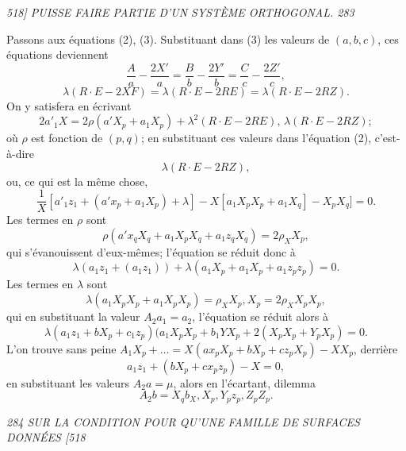 \documentclass[11pt,a4paper]{book}
\begin{document}
\clearpage

\noindent\textit{518] \hfill PUISSE FAIRE PARTIE D'UN SYST\`EME ORTHOGONAL. \hfill 283}

\medskip

Passons aux \'equations (2), (3). Substituant dans (3) les valeurs de $(a, b, c)$, ces
\'equations deviennent
\[
\frac{A}{a} - \frac{2X'}{a} = \frac{B}{b} - \frac{2Y'}{b} = \frac{C}{c} - \frac{2Z'}{c},
\]
\[
\lambda(R \cdot E - 2XF) = \lambda(R \cdot E - 2RE) = \lambda(R \cdot E - 2RZ).
\]
On y satisfera en \'ecrivant
\[
2a'_1 X = 2\rho(a' X_p + a_1 X_p) + \lambda^2(R \cdot E - 2RE), \, \lambda(R \cdot E - 2RZ);
\]
o\`u $\rho$ est fonction de $(p, q)$; en substituant ces valeurs dans l'\'equation (2), c'est-\`a-dire
\[
\lambda(R \cdot E - 2RZ),
\]
ou, ce qui est la m\^eme chose,
\[
\frac{1}{X}[a'_1 z_1 + (a' x_p + a_1 X_p) + \lambda] - X[a_1 X_p X_p + a_1 X_q] - X_p X_q] = 0.
\]
Les termes en $\rho$ sont
\[
\rho(a' x_q X_q + a_1 X_p X_q + a_1 z_q X_q) = 2\rho_X X_p,
\]
qui s'\'evanouissent d'eux-m\^emes; l'\'equation se r\'eduit donc \`a
\[
\lambda(a_1 z_1 + (a_1 z_1)) + \lambda(a_1 X_p + a_1 X_p + a_1 z_p z_p) = 0.
\]
Les termes en $\lambda$ sont
\[
\lambda(a_1 X_p X_p + a_1 X_p X_p) = \rho_X X_p, X_p = 2\rho_X X_p X_p,
\]
qui en substituant la valeur $A_2 a_1 = a_2$, l'\'equation se r\'eduit alors \`a
\[
\lambda(a_1 z_1 + b X_p + c_1 z_p)(a_1 X_p X_p + b_1 Y X_p + 2(X_p X_p + Y_p X_p) = 0.
\]
L'on trouve sans peine $A_1 X_p + \ldots = X (a x_p X_p + b X_p + c z_p X_p) - X X_p$, derri\`ere
\[
a_1 z_1 + (b X_p + c x_p z_p) - X = 0,
\]
en substituant les valeurs $A_2 a = \mu$, alors en l'\'ecartant, dilemma
\[
A_2 b = X_q b_X, X_p, Y_p z_p, Z_p Z_p.
\]

\clearpage

\noindent\textit{284 \hfill SUR LA CONDITION POUR QU'UNE FAMILLE DE SURFACES DONN\'EES \hfill [518}

\medskip
\end{document}
